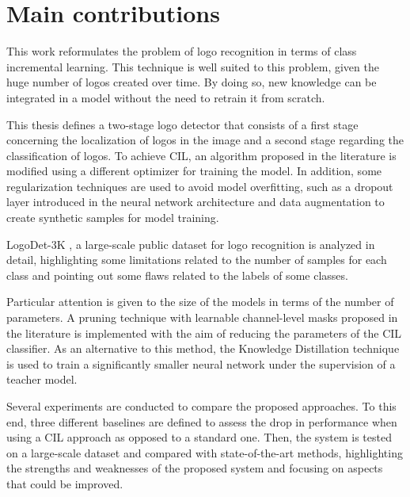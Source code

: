 \section{Main contributions}
This work reformulates the problem of logo recognition in terms of class incremental learning. This technique is well suited to this problem, given the huge number of logos created over time. By doing so, new knowledge can be integrated in a model without the need to retrain it from scratch.

This thesis defines a two-stage logo detector that consists of a first stage concerning the localization of logos in the image and a second stage regarding the classification of logos. 
To achieve CIL, an algorithm proposed in the literature is modified using a different optimizer for training the model. In addition, some regularization techniques are used to avoid model overfitting, such as a dropout layer introduced in the neural network architecture and data augmentation to create synthetic samples for model training.

LogoDet-3K \cite{wang2022logodet}, a large-scale public dataset for logo recognition is analyzed in detail, highlighting some limitations related to the number of samples for each class and pointing out some flaws related to the labels of some classes.

Particular attention is given to the size of the models in terms of the number of parameters. A pruning technique with learnable channel-level masks proposed in the literature is implemented with the aim of reducing the parameters of the CIL classifier.
As an alternative to this method, the Knowledge Distillation technique is used to train a significantly smaller neural network under the supervision of a teacher model.

Several experiments are conducted to compare the proposed approaches. To this end, three different baselines are defined to assess the drop in performance when using a CIL approach as opposed to a standard one. Then, the system is tested on a large-scale dataset and compared with state-of-the-art methods, highlighting the strengths and weaknesses of the proposed system and focusing on aspects that could be improved.


